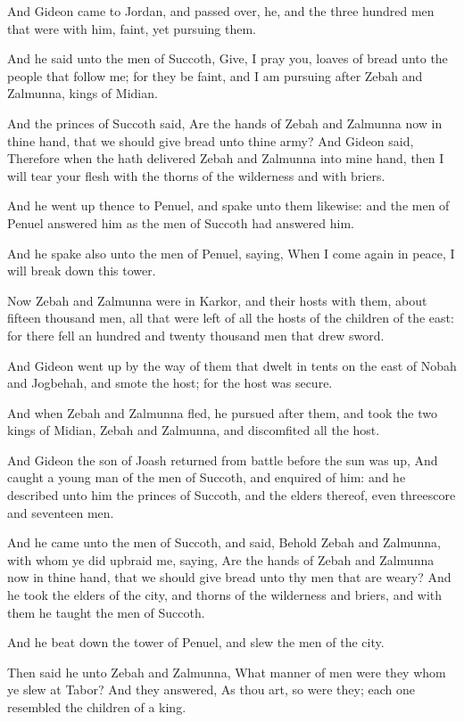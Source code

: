 \verse And Gideon came to Jordan, and passed over, he, and the three hundred men that were with him, faint, yet pursuing them.

\verse And he said unto the men of Succoth, Give, I pray you, loaves of bread unto the people that follow me; for they be faint, and I am pursuing after Zebah and Zalmunna, kings of Midian.

\verse And the princes of Succoth said, Are the hands of Zebah and Zalmunna now in thine hand, that we should give bread unto thine army?  \verse And Gideon said, Therefore when the \LORD hath delivered Zebah and Zalmunna into mine hand, then I will tear your flesh with the thorns of the wilderness and with briers.

\verse And he went up thence to Penuel, and spake unto them likewise: and the men of Penuel answered him as the men of Succoth had answered him.

\verse And he spake also unto the men of Penuel, saying, When I come again in peace, I will break down this tower.

\verse Now Zebah and Zalmunna were in Karkor, and their hosts with them, about fifteen thousand men, all that were left of all the hosts of the children of the east: for there fell an hundred and twenty thousand men that drew sword.

\verse And Gideon went up by the way of them that dwelt in tents on the east of Nobah and Jogbehah, and smote the host; for the host was secure.

\verse And when Zebah and Zalmunna fled, he pursued after them, and took the two kings of Midian, Zebah and Zalmunna, and discomfited all the host.

\verse And Gideon the son of Joash returned from battle before the sun was up, \verse And caught a young man of the men of Succoth, and enquired of him: and he described unto him the princes of Succoth, and the elders thereof, even threescore and seventeen men.

\verse And he came unto the men of Succoth, and said, Behold Zebah and Zalmunna, with whom ye did upbraid me, saying, Are the hands of Zebah and Zalmunna now in thine hand, that we should give bread unto thy men that are weary?  \verse And he took the elders of the city, and thorns of the wilderness and briers, and with them he taught the men of Succoth.

\verse And he beat down the tower of Penuel, and slew the men of the city.

\verse Then said he unto Zebah and Zalmunna, What manner of men were they whom ye slew at Tabor? And they answered, As thou art, so were they; each one resembled the children of a king.

